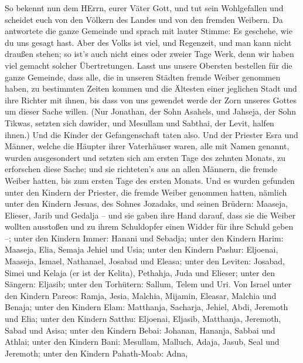  So bekennt nun dem HErrn, eurer Väter Gott, und tut sein
Wohlgefallen und scheidet euch von den Völkern des Landes und von den
fremden Weibern.  Da antwortete die ganze Gemeinde und
sprach mit lauter Stimme: Es geschehe, wie du uns gesagt hast.
 Aber des Volks ist viel, und Regenzeit, und man kann nicht
draußen stehen; so ist's auch nicht eines oder zweier Tage Werk, denn
wir haben viel gemacht solcher Übertretungen.  Lasst uns
unsere Obersten bestellen für die ganze Gemeinde, dass alle, die in
unseren Städten fremde Weiber genommen haben, zu bestimmten Zeiten
kommen und die Ältesten einer jeglichen Stadt und ihre Richter mit
ihnen, bis dass von uns gewendet werde der Zorn unseres Gottes um dieser
Sache willen.  (Nur Jonathan, der Sohn Asahels, und
Jahseja, der Sohn Tikwas, setzten sich dawider, und Mesullam und
Sabthai, der Levit, halfen ihnen.)  Und die Kinder der
Gefangenschaft taten also. Und der Priester Esra und Männer, welche die
Häupter ihrer Vaterhäuser waren, alle mit Namen genannt, wurden
ausgesondert und setzten sich am ersten Tage des zehnten Monats, zu
erforschen diese Sache;  und sie richteten's aus an allen
Männern, die fremde Weiber hatten, bis zum ersten Tage des ersten
Monats.  Und es wurden gefunden unter den Kindern der
Priester, die fremde Weiber genommen hatten, nämlich unter den Kindern
Jesuas, des Sohnes Jozadaks, und seinen Brüdern: Maaseja, Elieser, Jarib
und Gedalja  -- und sie gaben ihre Hand darauf, dass sie
die Weiber wollten ausstoßen und zu ihrem Schuldopfer einen Widder für
ihre Schuld geben --;  unter den Kindern Immer: Hanani und
Sebadja;  unter den Kindern Harim: Maaseja, Elia, Semaja
Jehiel und Usia;  unter den Kindern Pashur: Eljoenai,
Maaseja, Ismael, Nathanael, Josabad und Eleasa;  unter den
Leviten: Josabad, Simei und Kelaja (er ist der Kelita), Pethahja, Juda
und Elieser;  unter den Sängern: Eljasib; unter den
Torhütern: Sallum, Telem und Uri.  Von Israel unter den
Kindern Pareos: Ramja, Jesia, Malchia, Mijamin, Eleasar, Malchia und
Benaja;  unter den Kindern Elam: Matthanja, Sacharja,
Jehiel, Abdi, Jeremoth und Elia;  unter den Kindern Satthu:
Eljoenai, Eljasib, Matthanja, Jeremoth, Sabad und Asisa; 
unter den Kindern Bebai: Johanan, Hananja, Sabbai und Athlai;
 unter den Kindern Bani: Mesullam, Malluch, Adaja, Jasub,
Seal und Jeremoth;  unter den Kindern Pahath-Moab: Adna,
